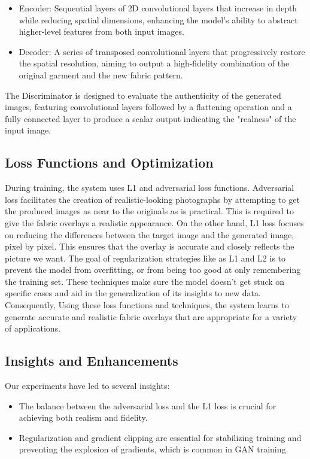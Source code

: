 \documentclass{article}
\begin{document}
\begin{itemize}
    \item Encoder: Sequential layers of 2D convolutional layers that increase in depth while reducing spatial dimensions, enhancing the model's ability to abstract higher-level features from both input images.
    \item Decoder: A series of transposed convolutional layers that progressively restore the spatial resolution, aiming to output a high-fidelity combination of the original garment and the new fabric pattern.
\end{itemize}

The Discriminator is designed to evaluate the authenticity of the generated images, featuring convolutional layers followed by a flattening operation and a fully connected layer to produce a scalar output indicating the "realness" of the input image.

\subsection{Loss Functions and Optimization}

During training, the system uses L1 and adversarial loss functions. Adversarial loss facilitates the creation of realistic-looking photographs by attempting to get the produced images as near to the originals as is practical. This is required to give the fabric overlays a realistic appearance. On the other hand, L1 loss focuses on reducing the differences between the target image and the generated image, pixel by pixel. This ensures that the overlay is accurate and closely reflects the picture we want. The goal of regularization strategies like as L1 and L2 is to prevent the model from overfitting, or from being too good at only remembering the training set. These techniques make sure the model doesn't get stuck on specific cases and aid in the generalization of its insights to new data. Consequently, Using these loss functions and techniques, the system learns to generate accurate and realistic fabric overlays that are appropriate for a variety of applications.



\subsection{Insights and Enhancements}

Our experiments have led to several insights:

\begin{itemize}
    \item The balance between the adversarial loss and the L1 loss is crucial for achieving both realism and fidelity.
    \item Regularization and gradient clipping are essential for stabilizing training and preventing the explosion of gradients, which is common in GAN training.
\end{itemize}
\end{document}
